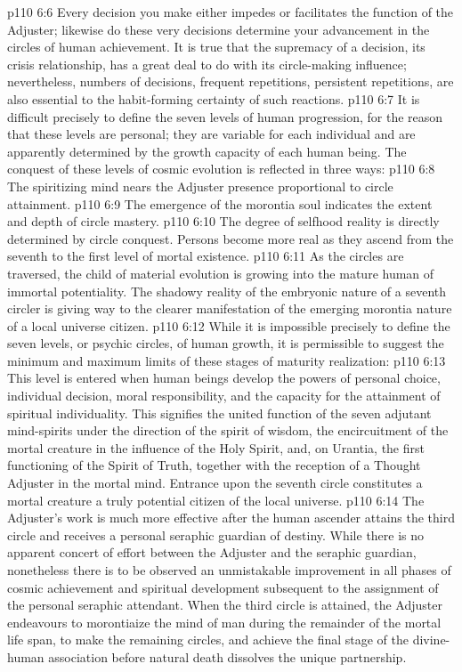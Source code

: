 \vs p110 6:6 \pc Every decision you make either impedes or facilitates the function of the Adjuster; likewise do these very decisions determine your advancement in the circles of human achievement. It is true that the supremacy of a decision, its crisis relationship, has a great deal to do with its circle\hyp{}making influence; nevertheless, numbers of decisions, frequent repetitions, persistent repetitions, are also essential to the habit\hyp{}forming certainty of such reactions.
\vs p110 6:7 It is difficult precisely to define the seven levels of human progression, for the reason that these levels are personal; they are variable for each individual and are apparently determined by the growth capacity of each human being. The conquest of these levels of cosmic evolution is reflected in three ways:
\vs p110 6:8 \bibnobreakspace {} The spiritizing mind nears the Adjuster presence proportional to circle attainment.
\vs p110 6:9 \bibnobreakspace {} The emergence of the morontia soul indicates the extent and depth of circle mastery.
\vs p110 6:10 \bibnobreakspace {} The degree of selfhood reality is directly determined by circle conquest. Persons become more real as they ascend from the seventh to the first level of mortal existence.
\vs p110 6:11 \pc As the circles are traversed, the child of material evolution is growing into the mature human of immortal potentiality. The shadowy reality of the embryonic nature of a seventh circler is giving way to the clearer manifestation of the emerging morontia nature of a local universe citizen.
\vs p110 6:12 While it is impossible precisely to define the seven levels, or psychic circles, of human growth, it is permissible to suggest the minimum and maximum limits of these stages of maturity realization:
\vs p110 6:13 \pc {} This level is entered when human beings develop the powers of personal choice, individual decision, moral responsibility, and the capacity for the attainment of spiritual individuality. This signifies the united function of the seven adjutant mind\hyp{}spirits under the direction of the spirit of wisdom, the encircuitment of the mortal creature in the influence of the Holy Spirit, and, on Urantia, the first functioning of the Spirit of Truth, together with the reception of a Thought Adjuster in the mortal mind. Entrance upon the seventh circle constitutes a mortal creature a truly potential citizen of the local universe.
\vs p110 6:14 \pc {} The Adjuster’s work is much more effective after the human ascender attains the third circle and receives a personal seraphic guardian of destiny. While there is no apparent concert of effort between the Adjuster and the seraphic guardian, nonetheless there is to be observed an unmistakable improvement in all phases of cosmic achievement and spiritual development subsequent to the assignment of the personal seraphic attendant. When the third circle is attained, the Adjuster endeavours to morontiaize the mind of man during the remainder of the mortal life span, to make the remaining circles, and achieve the final stage of the divine\hyp{}human association before natural death dissolves the unique partnership.
